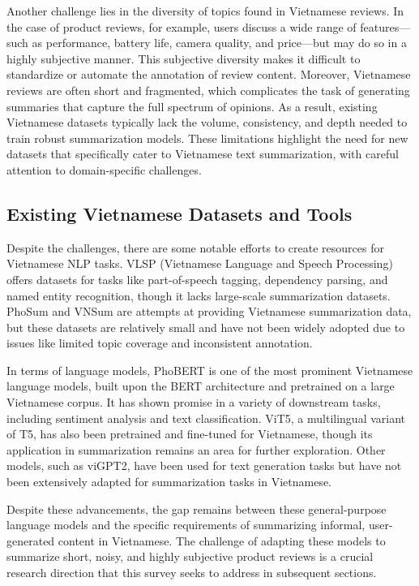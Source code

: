 \documentclass{article}
\begin{document}
Another challenge lies in the diversity of topics found in Vietnamese reviews. In the case of product reviews, for example, users discuss a wide range of features—such as performance, battery life, camera quality, and price—but may do so in a highly subjective manner. This subjective diversity makes it difficult to standardize or automate the annotation of review content. Moreover, Vietnamese reviews are often short and fragmented, which complicates the task of generating summaries that capture the full spectrum of opinions. As a result, existing Vietnamese datasets typically lack the volume, consistency, and depth needed to train robust summarization models. These limitations highlight the need for new datasets that specifically cater to Vietnamese text summarization, with careful attention to domain-specific challenges.

\subsection{Existing Vietnamese Datasets and Tools}

Despite the challenges, there are some notable efforts to create resources for Vietnamese NLP tasks. VLSP (Vietnamese Language and Speech Processing) offers datasets for tasks like part-of-speech tagging, dependency parsing, and named entity recognition, though it lacks large-scale summarization datasets. PhoSum and VNSum are attempts at providing Vietnamese summarization data, but these datasets are relatively small and have not been widely adopted due to issues like limited topic coverage and inconsistent annotation.

In terms of language models, PhoBERT is one of the most prominent Vietnamese language models, built upon the BERT architecture and pretrained on a large Vietnamese corpus. It has shown promise in a variety of downstream tasks, including sentiment analysis and text classification. ViT5, a multilingual variant of T5, has also been pretrained and fine-tuned for Vietnamese, though its application in summarization remains an area for further exploration. Other models, such as viGPT2, have been used for text generation tasks but have not been extensively adapted for summarization tasks in Vietnamese.

Despite these advancements, the gap remains between these general-purpose language models and the specific requirements of summarizing informal, user-generated content in Vietnamese. The challenge of adapting these models to summarize short, noisy, and highly subjective product reviews is a crucial research direction that this survey seeks to address in subsequent sections.
\end{document}
